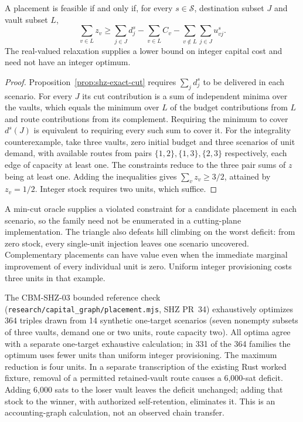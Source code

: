\begin{proposition}
\label{prop:shz-robust-placement}
A placement is feasible if and only if, for every $s\in\mathcal S$, destination subset $J$ and vault subset $L$,
\[
 \sum_{v\in L} z_v \ge
 \sum_{j\in J}d^s_j-\sum_{v\in L}C_v
 -\sum_{v\notin L}\sum_{j\in J}u^s_{vj}.
\]
The real-valued relaxation supplies a lower bound on integer capital cost and need not have an integer optimum.
\end{proposition}
\begin{proof}
Proposition~\ref{prop:shz-exact-cut} requires $\sum_jd^s_j$ to be delivered in each scenario. For every $J$ its cut contribution is a sum of independent minima over the vaults, which equals the minimum over $L$ of the budget contributions from $L$ and route contributions from its complement. Requiring the minimum to cover $d^s(J)$ is equivalent to requiring every such sum to cover it. For the integrality counterexample, take three vaults, zero initial budget and three scenarios of unit demand, with available routes from pairs $\{1,2\},\{1,3\},\{2,3\}$ respectively, each edge of capacity at least one. The constraints reduce to the three pair sums of $z$ being at least one. Adding the inequalities gives $\sum_v z_v\ge3/2$, attained by $z_v=1/2$. Integer stock requires two units, which suffice.
\end{proof}

A min-cut oracle supplies a violated constraint for a candidate placement in each scenario, so the family need not be enumerated in a cutting-plane implementation. The triangle also defeats hill climbing on the worst deficit: from zero stock, every single-unit injection leaves one scenario uncovered. Complementary placements can have value even when the immediate marginal improvement of every individual unit is zero. Uniform integer provisioning costs three units in that example.

The CBM-SHZ-03 bounded reference check (\texttt{research/capital\_graph/placement.mjs}, SHZ PR~34) exhaustively optimizes 364 triples drawn from 14 synthetic one-target scenarios (seven nonempty subsets of three vaults, demand one or two units, route capacity two). All optima agree with a separate one-target exhaustive calculation; in 331 of the 364 families the optimum uses fewer units than uniform integer provisioning. The maximum reduction is four units. In a separate transcription of the existing Rust worked fixture, removal of a permitted retained-vault route causes a 6,000-sat deficit. Adding 6,000 sats to the loser vault leaves the deficit unchanged; adding that stock to the winner, with authorized self-retention, eliminates it. This is an accounting-graph calculation, not an observed chain transfer.

